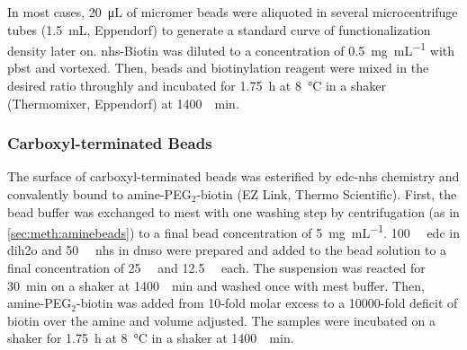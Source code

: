 In most cases, \SI{20}{\micro\liter} of micromer beads were aliquoted in several microcentrifuge tubes (\SI{1.5}{\milli\liter}, Eppendorf) to generate a standard curve of functionalization density later on. \gls{nhs}-Biotin was diluted to a concentration of \SI{0.5}{\milli\gram\per\milli\liter} with \gls{pbst} and vortexed. Then, beads and biotinylation reagent were mixed in the desired ratio throughly and incubated for \SI{1.75}{\hour} at \SI{8}{\degreeCelsius} in a shaker (Thermomixer, Eppendorf) at \SI{1400}{\per\minute}.

\subsubsection{Carboxyl-terminated Beads}
The surface of \gls{carboxyl}-terminated beads was esterified by \gls{edc}-\gls{nhs} chemistry and convalently bound to amine-PEG$_\mathrm{2}$-biotin (EZ Link, Thermo Scientific). First, the bead buffer was exchanged to \gls{mest} with one washing step by centrifugation (as in \ref{sec:meth:aminebeads}) to a final bead concentration of \SI{5}{\milli\gram\per\milli\liter}. \SI{100}{\milli\molar} \gls{edc} in \gls{dih2o} and \SI{50}{\milli\molar} \gls{nhs} in \gls{dmso} were prepared and added to the bead solution to a final concentration of \SI{25}{\milli\molar} and \SI{12.5}{\milli\molar} each. The suspension was reacted for \SI{30}{\minute} on a shaker at \SI{1400}{\per\minute} and washed once with \gls{mest} buffer. Then,  amine-PEG$_\mathrm{2}$-biotin was added from 10-fold molar excess to a \num{10000}-fold deficit of biotin over the amine and volume adjusted. The samples were incubated on a shaker for \SI{1.75}{\hour} at \SI{8}{\degreeCelsius} in a shaker at \SI{1400}{\per\minute}.

